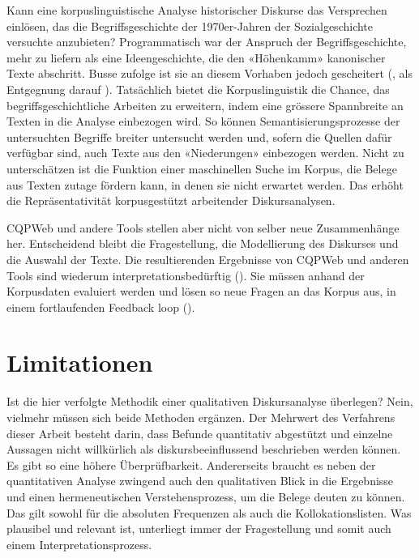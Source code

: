 Kann eine korpuslinguistische Analyse historischer Diskurse das Versprechen einlösen, das die Begriffsgeschichte der 1970er-Jahren der Sozialgeschichte versuchte anzubieten? Programmatisch war der Anspruch der Begriffsgeschichte, mehr zu liefern als eine Ideengeschichte, die den «Höhenkamm» kanonischer Texte abschritt. Busse zufolge ist sie an diesem Vorhaben jedoch gescheitert (\cite[50-71]{busse_historische_1987}, als Entgegnung darauf \cite[306]{dipper_geschichtlichen_2000}). Tatsächlich bietet die Korpuslinguistik die Chance, das begriffsgeschichtliche Arbeiten zu erweitern, indem eine grössere Spannbreite an Texten in die Analyse einbezogen wird. So können Semantisierungsprozesse der untersuchten Begriffe breiter untersucht werden und, sofern die Quellen dafür verfügbar sind, auch Texte aus den «Niederungen» einbezogen werden. Nicht zu unterschätzen ist die Funktion einer maschinellen Suche im Korpus, die Belege aus Texten zutage fördern kann, in denen sie nicht erwartet werden. Das erhöht die Repräsentativität korpusgestützt arbeitender Diskursanalysen.

CQPWeb und andere Tools stellen aber nicht von selber neue Zusammenhänge her. Entscheidend bleibt die Fragestellung, die Modellierung des Diskurses und die Auswahl der Texte. Die resultierenden Ergebnisse von CQPWeb und anderen Tools sind wiederum interpretationsbedürftig (\cite[33]{schwandt_digitale_2018}). Sie müssen anhand der Korpusdaten evaluiert werden und lösen so neue Fragen an das Korpus aus, in einem fortlaufenden Feedback loop (\cite[320-322]{bubenhofer_sprachgebrauchsmuster_2009}).

\section{Limitationen}

Ist die hier verfolgte Methodik einer qualitativen Diskursanalyse überlegen? Nein, vielmehr müssen sich beide Methoden ergänzen. Der Mehrwert des Verfahrens dieser Arbeit besteht darin, dass Befunde quantitativ abgestützt und einzelne Aussagen nicht willkürlich als diskursbeeinflussend beschrieben werden können. Es gibt so eine höhere Überprüfbarkeit. Andererseits braucht es neben der quantitativen Analyse zwingend auch den qualitativen Blick in die Ergebnisse und einen hermeneutischen Verstehensprozess, um die Belege deuten zu können. Das gilt sowohl für die absoluten Frequenzen als auch die Kollokationslisten. Was plausibel und relevant ist, unterliegt immer der Fragestellung und somit auch einem Interpretationsprozess.

